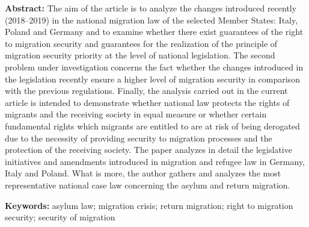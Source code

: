 \documentclass[10pt,a4paper]{article}
\begin{document}
\textbf{{\color{LibrelloColor}Abstract:}} The aim of the article is to analyze the changes introduced recently (2018--2019) in the national migration law of the selected Member States: Italy, Poland and Germany and to examine whether there exist guarantees of the right to migration security and guarantees for the realization of the principle of migration security priority at the level of national legislation. The second problem under investigation concerns the fact whether the changes introduced in the legislation recently ensure a higher level of migration security in comparison with the previous regulations. Finally, the analysis carried out in the current article is intended to demonstrate whether national law protects the rights of migrants and the receiving society in equal measure or whether certain fundamental rights which migrants are entitled to are at risk of being derogated due to the necessity of providing security to migration processes and the protection of the receiving society. The paper analyzes in detail the legislative initiatives and amendments introduced in migration and refugee law in Germany, Italy and Poland. What is more, the author gathers and analyzes the most representative national case law concerning the asylum and return migration.

\textbf{{\color{LibrelloColor}Keywords:}} asylum law; migration crisis; return migration; right to migration security; security of migration

\par\endgroup

\setlength{\parindent}{0.5cm}
\setlength{\parskip}{0cm}
\setlength{\bibsep}{0cm}
\end{document}
